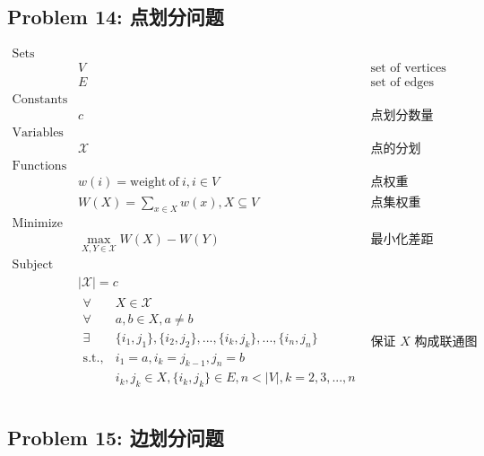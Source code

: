 \documentclass[11pt]{article}
\begin{document}
\newpage
\subsection*{Problem 14: 点划分问题}

\begin{eqnarray*}
    \textrm{Sets} \\
        & V & \textrm{set of vertices} \\
        & E & \textrm{set of edges} \\
    \textrm{Constants} \\
        & c & \textrm{点划分数量} \\
    \textrm{Variables} \\
        & \mathcal{X} & \textrm{点的分划} \\
    \textrm{Functions} \\
        & w(i) = \mathrm{weight\ of\ } i, i \in V & \textrm{点权重} \\
        & W(X) = \sum_{x \in X} w(x) , X \subseteq V & \textrm{点集权重} \\
    \textrm{Minimize} \\
        & \displaystyle \max_{X, Y \in \mathcal{X}} W(X) - W(Y) & \textrm{最小化差距} \\
    \textrm{Subject to} \\
        & |\mathcal{X}| = c & \\
        & \begin{array}{rl}
            \forall & X \in \mathcal{X} \\
            \forall & a, b \in X, a \neq b \\
            \exists & \{i_1, j_1\}, \{i_2, j_2\}, ..., \{i_k, j_k\}, ..., \{i_n, j_n\} \\
            \mathrm{s.t.,} & i_1 = a, i_k = j_{k-1}, j_n = b \\
                    & i_k, j_k \in X, \{i_k, j_k\} \in E, n < |V|, k = 2, 3, ..., n
        \end{array} & \textrm{保证 $X$ 构成联通图} \\ 
\end{eqnarray*}
\newpage


\subsection*{Problem 15: 边划分问题}
\end{document}
